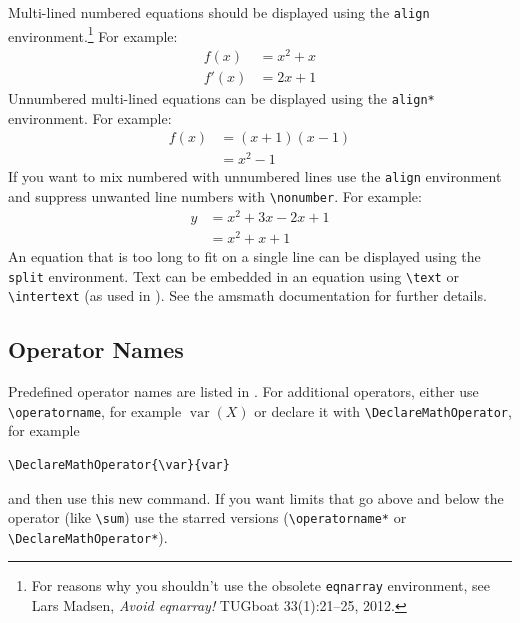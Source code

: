 \documentclass[pmlr,twocolumn]{jmlr} %
\begin{document}
Multi-lined numbered equations should be displayed using the
\texttt{align} environment.\footnote{For reasons why you 
shouldn't use the obsolete \texttt{eqnarray} environment, see
Lars Madsen, \emph{Avoid eqnarray!} TUGboat 33(1):21--25, 2012.} For example:
\begin{align}
f(x) &= x^2 + x\label{eq:f}\\
f'(x) &= 2x + 1\label{eq:df}
\end{align}
Unnumbered multi-lined equations can be displayed using the
\texttt{align*} environment. For example:
\begin{align*}
f(x) &= (x+1)(x-1)\\
&= x^2 - 1
\end{align*}
If you want to mix numbered with unnumbered lines use the
\texttt{align} environment and suppress unwanted line numbers with
\verb|\nonumber|. For example:
\begin{align}
y &= x^2 + 3x - 2x + 1\nonumber\\
&= x^2 + x + 1\label{eq:y}
\end{align}
An equation that is too long to fit on a single line can be
displayed using the \texttt{split} environment. 
Text can be embedded in an equation using \verb|\text| or
\verb|\intertext| (as used in ).
See the \textsf{amsmath} documentation for further details.

\subsection{Operator Names}
\label{sec:op}

Predefined operator names are listed in .
For additional operators, either use \verb|\operatorname|,
for example $\operatorname{var}(X)$ or declare it with
\verb|\DeclareMathOperator|, for example
\begin{verbatim}
\DeclareMathOperator{\var}{var}
\end{verbatim}
and then use this new command. If you want limits that go above and
below the operator (like \verb|\sum|) use the starred versions
(\verb|\operatorname*| or \verb|\DeclareMathOperator*|).
\end{document}
